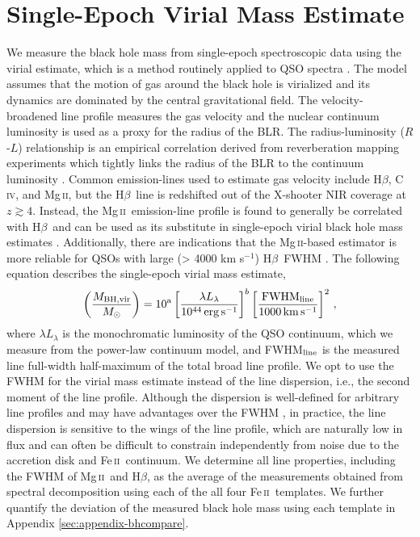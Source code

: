\documentclass[fleqn,usenatbib]{mnras}
\newcommand{\mgii}{Mg\,\textsc{ii}}
\newcommand{\civ}{C\,\textsc{iv}}
\newcommand{\feii}{Fe\,\textsc{ii}}
\newcommand{\hbeta}{H\textsc{$\beta$}}
\begin{document}
\section{Single-Epoch Virial Mass Estimate} \label{sec:virial_mbh}
We measure the black hole mass from single-epoch spectroscopic data using the virial estimate, which is a method routinely applied to QSO spectra \citep[e.g.,][]{Vestergaard_2002, Mclure_2002, Mclure_2004, Greene_2005, Vestergaard_2006}. The model assumes that the motion of gas around the black hole is virialized and its dynamics are dominated by the central gravitational field. The velocity-broadened line profile measures the gas velocity and the nuclear continuum luminosity is used as a proxy for the radius of the BLR. The radius-luminosity ($R$-$L$) relationship is an empirical correlation derived from reverberation mapping experiments which tightly links the radius of the BLR to the continuum luminosity \citep[e.g.,][]{Kaspi_2000, Kaspi_2005, Bentz_2006, Bentz_2013}. Common emission-lines used to estimate gas velocity include \hbeta, \civ, and \mgii, but the \hbeta\ line is redshifted out of the X-shooter NIR coverage at $z \gtrsim 4$. Instead, the \mgii\, emission-line profile is found to generally be correlated with \hbeta\ and can be used as its substitute in single-epoch virial black hole mass estimates \citep[e.g.,][]{Salviander_2007, Shen_2008, Wang_2009, Shen_2012}. Additionally, there are indications that the \mgii-based estimator is more reliable for QSOs with large (> 4000 km s$^{-1}$) \hbeta\ FWHM \citep[see][]{Marziani_2013}. The following equation describes the single-epoch virial mass estimate,
\begin{equation}
   \left(\frac{M_{\rm{BH,vir}}}{M_{\odot}}\right) = 10^{\rm{a}} \left[\frac{\lambda L_{\lambda}}{10^{44} \,\rm{erg\, s^{-1}}}\right]^{b} \left[\frac{\rm{FWHM_{\rm{line}}}}{1000 \,\rm{km\, s^{-1}}}\right]^{2} \,,
   \label{eq:mgii_virial}
\end{equation}
where $\lambda L_{\lambda}$ is the monochromatic luminosity of the QSO continuum, which we measure from the power-law continuum model, and FWHM$_{\rm{line}}$ is the measured line full-width half-maximum of the total broad line profile. We opt to use the FWHM for the virial mass estimate instead of the line dispersion, i.e., the second moment of the line profile. Although the dispersion is well-defined for arbitrary line profiles and may have advantages over the FWHM \citep[e.g.,][]{Fromerth_2000, Peterson_2004, Collin_2006, Rafiee_2011, DallaBonta_2020}, in practice, the line dispersion is sensitive to the wings of the line profile, which are naturally low in flux and can often be difficult to constrain independently from noise due to the accretion disk and \feii\ continuum. We determine all line properties, including the FWHM of \mgii\ and \hbeta, as the average of the measurements obtained from spectral decomposition using each of the all four \feii\ templates. We further quantify the deviation of the measured black hole mass using each template in Appendix \ref{sec:appendix-bhcompare}.
\end{document}
